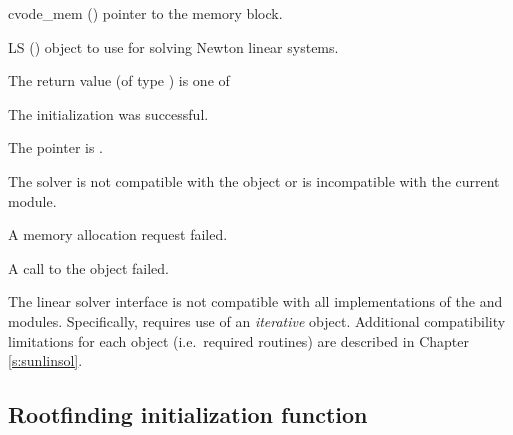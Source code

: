 {
  \begin{args}
  \item[cvode\_mem] ()
    pointer to the {\cvode} memory block.
  \item[LS] ()
    {\sunlinsol} object to use for solving Newton linear systems. 
  \end{args}
}
{
  The return value  (of type ) is one of
  \begin{args}
  \item[\Id{CVSPILS\_SUCCESS}] 
    The {\cvspils} initialization was successful.
  \item[\Id{CVSPILS\_MEM\_NULL}]
    The  pointer is .
  \item[\Id{CVSPILS\_ILL\_INPUT}]
    The {\cvspils} solver is not compatible with the  object
    or is incompatible with the current {\nvector} module.
  \item[\Id{CVSPILS\_MEM\_FAIL}]
    A memory allocation request failed.
  \item[\Id{CVSPILS\_SUNLS\_FAIL}]
    A call to the  object failed.
  \end{args}
}
{
  The {\cvspils} linear solver interface is not compatible with all
  implementations of the {\sunlinsol} and {\nvector}
  modules.  Specifically, {\cvspils} requires use of an
  \emph{iterative} {\sunlinsol} object.  Additional compatibility
  limitations for each {\sunlinsol} object (i.e.~required {\nvector}
  routines) are described in Chapter \ref{s:sunlinsol}.
}



\subsection{Rootfinding initialization function}\label{ss:cvrootinit}

